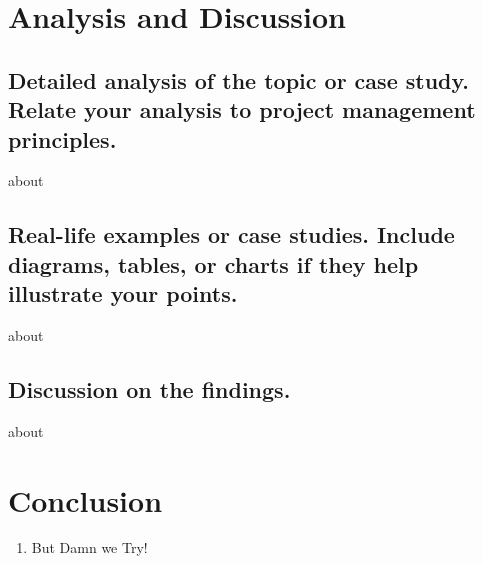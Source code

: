 \documentclass[12pt]{article}
\begin{document}
\section{Analysis and Discussion}
\subsection{Detailed analysis of the topic or case study. Relate your analysis to project
management principles.}
about
\subsection{Real-life examples or case studies. Include diagrams, tables, or charts if they
help illustrate your points.}
about
\subsection{Discussion on the findings.}
about

\section{Conclusion}













\newpage%



\begin{enumerate} %
\item But Damn we Try!
\end{enumerate}





\end{document}
